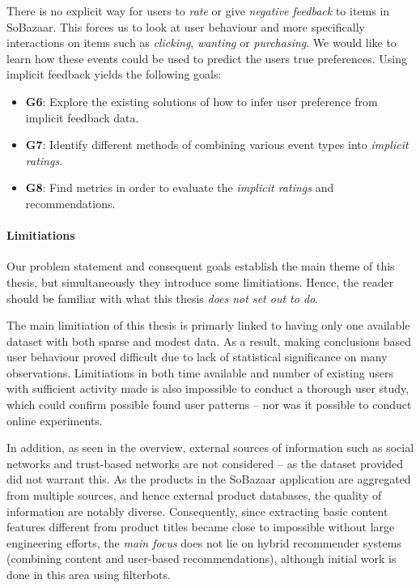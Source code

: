 There is no explicit way for users to \textit{rate} or give \textit{negative
feedback} to items in SoBazaar. This forces us to look at user behaviour and
more specifically interactions on items such as \textit{clicking},
\textit{wanting} or \textit{purchasing}. We would like to learn how these
events could be used to predict the users true preferences. Using implicit
feedback yields the following goals:

\begin{itemize}
  \item \textbf{G6}: Explore the existing solutions of how to infer user preference from
  implicit feedback data.
  \item \textbf{G7}: Identify different methods of combining various event types into
  \emph{implicit ratings}.
  \item \textbf{G8}: Find metrics in order to evaluate the \emph{implicit
  ratings} and recommendations.
\end{itemize}

\paragraph{Limitiations} Our problem statement and consequent goals establish
the main theme of this thesis, but simultaneously they introduce some
limitiations. Hence, the reader should be familiar with what this thesis
\textit{does not set out to do}.

The main limitiation of this thesis is primarly linked to having only one
available dataset with both sparse and modest data. As a result, making
conclusions based user behaviour proved difficult due to lack of statistical
significance on many observations. Limitiations in both time available and
number of existing users with sufficient activity made is also impossible to
conduct a thorough user study, which could confirm possible found user
patterns -- nor was it possible to conduct online experiments.

In addition, as seen in the overview, external sources of information such as
social networks and trust-based networks are not considered -- as the dataset
provided did not warrant this. As the products in the SoBazaar application are
aggregated from multiple sources, and hence external product databases, the
quality of information are notably diverse. Consequently, since extracting
basic content features different from product titles became close to impossible
without large engineering efforts, the \textit{main focus} does not lie on
hybrid recommender systems (combining content and user-based recommendations),
although initial work is done in this area using filterbots.

